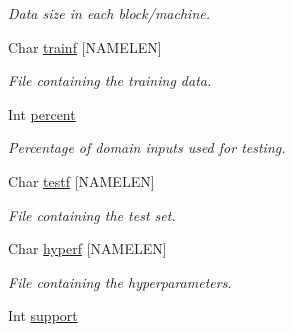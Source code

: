 \begin{DoxyCompactItemize}
\begin{DoxyCompactList}\small\item\em Data size in each block/machine. \end{DoxyCompactList}\item 
\hypertarget{structt__command__prep_a7c6fcd0ab10f8fb7d1f37209ff4754b3}{Char \hyperlink{structt__command__prep_a7c6fcd0ab10f8fb7d1f37209ff4754b3}{trainf} \mbox{[}N\-A\-M\-E\-L\-E\-N\mbox{]}}\label{structt__command__prep_a7c6fcd0ab10f8fb7d1f37209ff4754b3}

\begin{DoxyCompactList}\small\item\em File containing the training data. \end{DoxyCompactList}\item 
\hypertarget{structt__command__prep_a4b948a1a01c4434772d8b34f91023a3b}{Int \hyperlink{structt__command__prep_a4b948a1a01c4434772d8b34f91023a3b}{percent}}\label{structt__command__prep_a4b948a1a01c4434772d8b34f91023a3b}

\begin{DoxyCompactList}\small\item\em Percentage of domain inputs used for testing. \end{DoxyCompactList}\item 
\hypertarget{structt__command__prep_af2e121153fa801d803b0df9b6a4e6180}{Char \hyperlink{structt__command__prep_af2e121153fa801d803b0df9b6a4e6180}{testf} \mbox{[}N\-A\-M\-E\-L\-E\-N\mbox{]}}\label{structt__command__prep_af2e121153fa801d803b0df9b6a4e6180}

\begin{DoxyCompactList}\small\item\em File containing the test set. \end{DoxyCompactList}\item 
\hypertarget{structt__command__prep_adacbfccb9bc1373a0383aeb7e392f303}{Char \hyperlink{structt__command__prep_adacbfccb9bc1373a0383aeb7e392f303}{hyperf} \mbox{[}N\-A\-M\-E\-L\-E\-N\mbox{]}}\label{structt__command__prep_adacbfccb9bc1373a0383aeb7e392f303}

\begin{DoxyCompactList}\small\item\em File containing the hyperparameters. \end{DoxyCompactList}\item 
\hypertarget{structt__command__prep_ac4a2e1b1ae951cef4e6a1b75e5e5556d}{Int \hyperlink{structt__command__prep_ac4a2e1b1ae951cef4e6a1b75e5e5556d}{support}}\label{structt__command__prep_ac4a2e1b1ae951cef4e6a1b75e5e5556d}


\end{DoxyCompactItemize}
